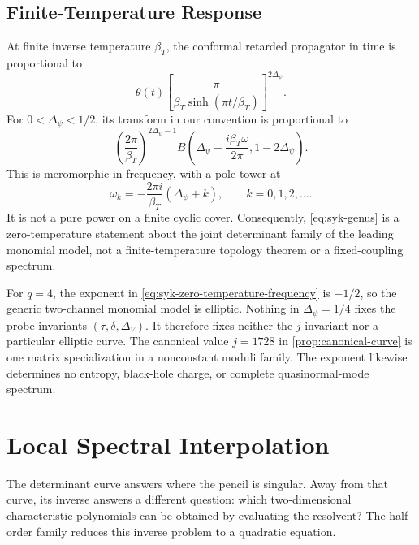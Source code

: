 \documentclass[11pt,reqno]{amsart}
\theoremstyle{remark}
\begin{document}
\subsection{Finite-Temperature Response}

At finite inverse temperature $\beta_T$, the conformal retarded propagator in
time is proportional to
\begin{equation}\label{eq:finite-T-retarded}
 \theta(t)\left[
 \frac{\pi}{\beta_T\sinh(\pi t/\beta_T)}
 \right]^{2\Delta_\psi}.
\end{equation}
For $0<\Delta_\psi<1/2$, its transform in our convention is proportional to
\begin{equation}\label{eq:finite-T-beta-function}
 \left(\frac{2\pi}{\beta_T}\right)^{2\Delta_\psi-1}
 B\left(
 \Delta_\psi-\frac{i\beta_T\omega}{2\pi},
 1-2\Delta_\psi
 \right).
\end{equation}
This is meromorphic in frequency, with a pole tower at
\begin{equation}\label{eq:finite-T-poles}
 \omega_k=-\frac{2\pi i}{\beta_T}(\Delta_\psi+k),
 \qquad k=0,1,2,\ldots.
\end{equation}
It is not a pure power on a finite cyclic cover.  Consequently,
\eqref{eq:syk-genus} is a zero-temperature statement about the joint
determinant family of the leading monomial model, not a finite-temperature
topology theorem or a fixed-coupling spectrum.

For $q=4$, the exponent in \eqref{eq:syk-zero-temperature-frequency} is
$-1/2$, so the generic two-channel monomial model is elliptic.  Nothing in
$\Delta_\psi=1/4$ fixes the probe invariants
$(\tau,\delta,\Delta_V)$.  It therefore fixes neither the $j$-invariant nor a
particular elliptic curve.  The canonical value $j=1728$ in
\cref{prop:canonical-curve} is one matrix specialization in a nonconstant
moduli family.  The exponent likewise determines no entropy, black-hole
charge, or complete quasinormal-mode spectrum.

\section{Local Spectral Interpolation}\label{sec:interpolation}

The determinant curve answers where the pencil is singular.  Away from that
curve, its inverse answers a different question: which two-dimensional
characteristic polynomials can be obtained by evaluating the resolvent?  The
half-order family reduces this inverse problem to a quadratic equation.
\end{document}
